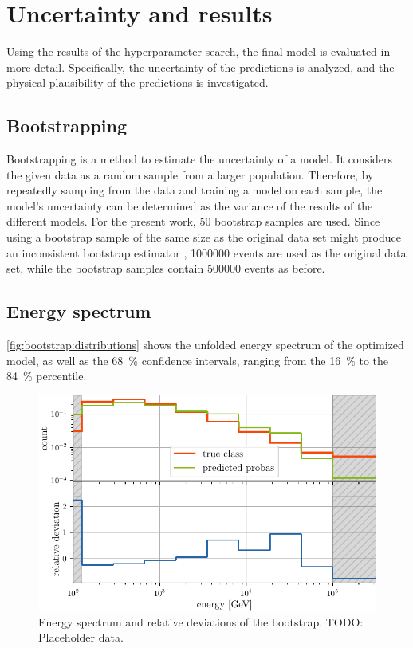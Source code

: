\section{Uncertainty and results}
Using the results of the hyperparameter search,
the final model is evaluated in more detail.
Specifically,
  the uncertainty of the predictions is analyzed, %
  and the physical plausibility of the predictions is investigated.


\subsection{Bootstrapping}
Bootstrapping \cite{bootstrap} is a method to estimate the uncertainty of a model.
It considers the given data as a random sample from a larger population.
Therefore,
by repeatedly sampling from the data and training a model on each sample,
the model's uncertainty can be determined
as the variance of the results of the different models.
%
For the present work, \num{50} bootstrap samples are used. %
Since using a bootstrap sample of the same size as the original data set
might produce an inconsistent bootstrap estimator \cite{bootstrap_samplesize},
\num{1000000} events are used as the original data set,
while the bootstrap samples contain \num{500000} events as before.


\subsection{Energy spectrum}
\autoref{fig:bootstrap:distributions} shows the unfolded energy spectrum of the optimized model,
as well as the \SI{68}{\percent} confidence intervals,
  ranging from the \SI{16}{\percent} to the \SI{84}{\percent} percentile.

\blindtext[2]

\begin{figure}
  \centering
  \includegraphics[scale=1]{content/plots/bootstrap:spectrum.pdf}
  \caption{
    Energy spectrum and relative deviations of the bootstrap.
    TODO: Placeholder data.
  }
  \label{fig:bootstrap:spectrum}
\end{figure}


